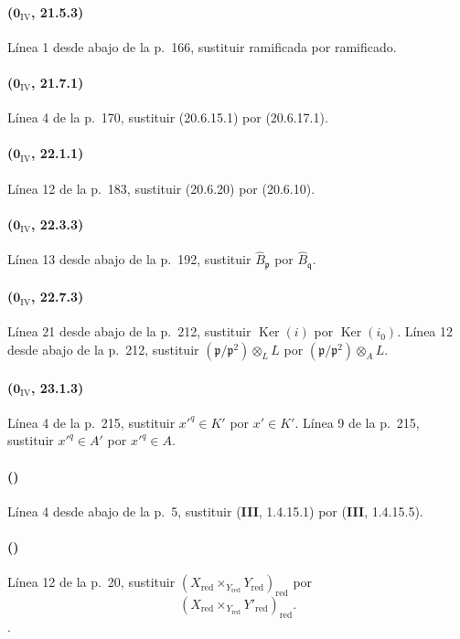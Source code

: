 \paragraph{($\mathbf{0}_{\mathrm{IV}}$, 21.5.3)}
Línea 1 desde abajo de la p.~166, sustituir ramificada por ramificado.

\paragraph{($\mathbf{0}_{\mathrm{IV}}$, 21.7.1)}
Línea 4 de la p.~170, sustituir (20.6.15.1) por (20.6.17.1).

\paragraph{($\mathbf{0}_{\mathrm{IV}}$, 22.1.1)}
Línea 12 de la p.~183, sustituir (20.6.20) por (20.6.10).

\paragraph{($\mathbf{0}_{\mathrm{IV}}$, 22.3.3)}
Línea 13 desde abajo de la p.~192, sustituir $\widehat B_{\mathfrak p}$ por
$\widehat B_{\mathfrak q}$.

\paragraph{($\mathbf{0}_{\mathrm{IV}}$, 22.7.3)}
Línea 21 desde abajo de la p.~212, sustituir $\operatorname{Ker}(i)$ por
$\operatorname{Ker}(i_0)$. Línea 12 desde abajo de la p.~212, sustituir
$(\mathfrak p/\mathfrak p^2)\otimes_L L$ por
$(\mathfrak p/\mathfrak p^2)\otimes_A L$.

\paragraph{($\mathbf{0}_{\mathrm{IV}}$, 23.1.3)}
Línea 4 de la p.~215, sustituir $x'^q\in K'$ por $x'\in K'$. Línea 9
de la p.~215, sustituir $x'^q\in A'$ por $x'^q\in A$.

\paragraph{({\texorpdfstring{\protect{}}{IV, 2.1.1}})}
Línea 4 desde abajo de la p.~5, sustituir (\textbf{III}, 1.4.15.1) por
(\textbf{III}, 1.4.15.5).

\paragraph{({\texorpdfstring{\protect{}}{IV, 2.4.3}})}
Línea 12 de la p.~20, sustituir
$(X_{\mathrm{red}}\times_{Y_{\mathrm{red}}}Y_{\mathrm{red}})_{\mathrm{red}}$
por
\[
(X_{\mathrm{red}}\times_{Y_{\mathrm{red}}}Y'_{\mathrm{red}})_{\mathrm{red}}.
\].

